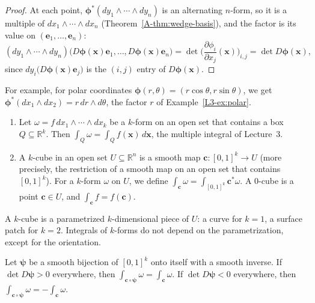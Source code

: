 \begin{proof}
    At each point, $\boldsymbol{\phi}^*(dy_1 \wedge \cdots \wedge dy_n)$ is an alternating $n$-form, so it is a multiple of $dx_1 \wedge \cdots \wedge dx_n$ (Theorem~\ref{A-thm:wedge-basis}), and the factor is its value on $(\mathbf{e}_1, \ldots, \mathbf{e}_n)$:
    \[(dy_1 \wedge \cdots \wedge dy_n)\big(D\boldsymbol{\phi}(\mathbf{x})\mathbf{e}_1, \ldots, D\boldsymbol{\phi}(\mathbf{x})\mathbf{e}_n\big) = \det\Big(\frac{\partial \phi_i}{\partial x_j}(\mathbf{x})\Big)_{i,j} = \det D\boldsymbol{\phi}(\mathbf{x}),\]
    since $dy_i\big(D\boldsymbol{\phi}(\mathbf{x})\mathbf{e}_j\big)$ is the $(i, j)$ entry of $D\boldsymbol{\phi}(\mathbf{x})$.
\end{proof}

For example, for polar coordinates $\boldsymbol{\phi}(r, \theta) = (r\cos\theta, r\sin\theta)$, we get $\boldsymbol{\phi}^*(dx_1 \wedge dx_2) = r\, dr \wedge d\theta$, the factor $r$ of Example~\ref{L3-ex:polar}.

\begin{definition}\label{A-def:form-integral}
    \begin{enumerate}
        \item Let $\omega = f\, dx_1 \wedge \cdots \wedge dx_k$ be a $k$-form on an open set that contains a box $Q \subseteq \mathbb{R}^k$. Then $\int_Q \omega = \int_Q f(\mathbf{x})\, d\mathbf{x}$, the multiple integral of Lecture~3.
        \item A $k$-cube in an open set $U \subseteq \mathbb{R}^n$ is a smooth map $\mathbf{c}: [0, 1]^k \to U$ (more precisely, the restriction of a smooth map on an open set that contains $[0, 1]^k$). For a $k$-form $\omega$ on $U$, we define $\int_{\mathbf{c}} \omega = \int_{[0,1]^k} \mathbf{c}^*\omega$. A $0$-cube is a point $\mathbf{c} \in U$, and $\int_{\mathbf{c}} f = f(\mathbf{c})$.
    \end{enumerate}
\end{definition}

A $k$-cube is a parametrized $k$-dimensional piece of $U$: a curve for $k = 1$, a surface patch for $k = 2$. Integrals of $k$-forms do not depend on the parametrization, except for the orientation.

\begin{proposition}\label{A-prop:reparametrization}
    Let $\boldsymbol{\psi}$ be a smooth bijection of $[0, 1]^k$ onto itself with a smooth inverse. If $\det D\boldsymbol{\psi} > 0$ everywhere, then $\int_{\mathbf{c} \circ \boldsymbol{\psi}} \omega = \int_{\mathbf{c}} \omega$. If $\det D\boldsymbol{\psi} < 0$ everywhere, then $\int_{\mathbf{c} \circ \boldsymbol{\psi}} \omega = -\int_{\mathbf{c}} \omega$.
\end{proposition}

